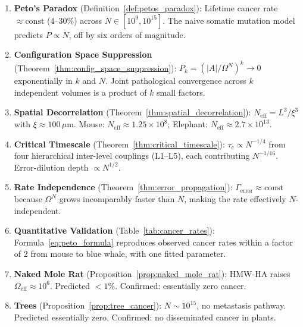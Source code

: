 \begin{chapterbox}[title=Chapter 8 --- Key Results Established]
\begin{enumerate}[label=\textbf{\arabic*.}]
  \item \textbf{Peto's Paradox} (Definition~\ref{def:petos_paradox}): Lifetime
        cancer rate $\approx\mathrm{const}$ ($4$--$30\%$) across $N \in [10^9, 10^{15}]$.
        The naive somatic mutation model predicts $P \propto N$, off by six
        orders of magnitude.

  \item \textbf{Configuration Space Suppression} (Theorem~\ref{thm:config_space_suppression}):
        $P_k = (|A|/\Omega^N)^k \to 0$ exponentially in $k$ and $N$. Joint
        pathological convergence across $k$ independent volumes is a product
        of $k$ small factors.

  \item \textbf{Spatial Decorrelation} (Theorem~\ref{thm:spatial_decorrelation}):
        $N_{\mathrm{eff}} = L^3/\xi^3$ with $\xi \approx 100\,\mu\mathrm{m}$.
        Mouse: $N_{\mathrm{eff}} \approx 1.25 \times 10^8$;
        Elephant: $N_{\mathrm{eff}} \approx 2.7 \times 10^{13}$.

  \item \textbf{Critical Timescale} (Theorem~\ref{thm:critical_timescale}):
        $\tau_c \propto N^{-1/4}$ from four hierarchical inter-level couplings
        (L1--L5), each contributing $N^{-1/16}$. Error-dilution depth
        $\propto N^{1/2}$.

  \item \textbf{Rate Independence} (Theorem~\ref{thm:error_propagation}):
        $\Gamma_{\mathrm{error}} \approx \mathrm{const}$ because $\Omega^N$
        grows incomparably faster than $N$, making the rate effectively
        $N$-independent.

  \item \textbf{Quantitative Validation} (Table~\ref{tab:cancer_rates}):
        Formula~\eqref{eq:peto_formula} reproduces observed cancer rates within
        a factor of 2 from mouse to blue whale, with one fitted parameter.

  \item \textbf{Naked Mole Rat} (Proposition~\ref{prop:naked_mole_rat}):
        HMW-HA raises $\Omega_{\mathrm{eff}} \approx 10^6$. Predicted $< 1\%$.
        Confirmed: essentially zero cancer.

  \item \textbf{Trees} (Proposition~\ref{prop:tree_cancer}):
        $N \sim 10^{15}$, no metastasis pathway. Predicted essentially zero.
        Confirmed: no disseminated cancer in plants.


\end{enumerate}
\end{chapterbox}
